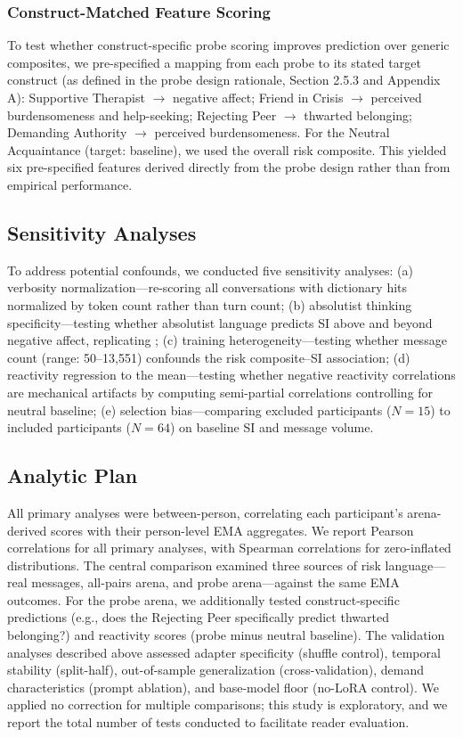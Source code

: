 \documentclass[review,12pt,authoryear]{elsarticle}
\begin{document}
\subsubsection{Construct-Matched Feature Scoring}

To test whether construct-specific probe scoring improves prediction over generic composites, we pre-specified a mapping from each probe to its stated target construct (as defined in the probe design rationale, Section 2.5.3 and Appendix A): Supportive Therapist $\rightarrow$ negative affect; Friend in Crisis $\rightarrow$ perceived burdensomeness and help-seeking; Rejecting Peer $\rightarrow$ thwarted belonging; Demanding Authority $\rightarrow$ perceived burdensomeness. For the Neutral Acquaintance (target: baseline), we used the overall risk composite. This yielded six pre-specified features derived directly from the probe design rather than from empirical performance.

\subsection{Sensitivity Analyses}

To address potential confounds, we conducted five sensitivity analyses: (a) verbosity normalization---re-scoring all conversations with dictionary hits normalized by token count rather than turn count; (b) absolutist thinking specificity---testing whether absolutist language predicts SI above and beyond negative affect, replicating \citet{almosaiwi2018absolute}; (c) training heterogeneity---testing whether message count (range: 50--13,551) confounds the risk composite--SI association; (d) reactivity regression to the mean---testing whether negative reactivity correlations are mechanical artifacts by computing semi-partial correlations controlling for neutral baseline; (e) selection bias---comparing excluded participants ($N = 15$) to included participants ($N = 64$) on baseline SI and message volume.

\subsection{Analytic Plan}

All primary analyses were between-person, correlating each participant's arena-derived scores with their person-level EMA aggregates. We report Pearson correlations for all primary analyses, with Spearman correlations for zero-inflated distributions. The central comparison examined three sources of risk language---real messages, all-pairs arena, and probe arena---against the same EMA outcomes. For the probe arena, we additionally tested construct-specific predictions (e.g., does the Rejecting Peer specifically predict thwarted belonging?) and reactivity scores (probe minus neutral baseline). The validation analyses described above assessed adapter specificity (shuffle control), temporal stability (split-half), out-of-sample generalization (cross-validation), demand characteristics (prompt ablation), and base-model floor (no-LoRA control). We applied no correction for multiple comparisons; this study is exploratory, and we report the total number of tests conducted to facilitate reader evaluation.
\end{document}
